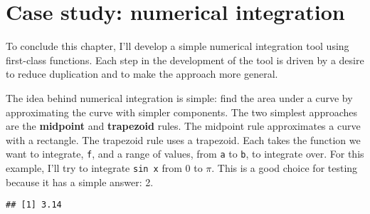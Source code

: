 \hypertarget{numerical-integration}{%
\section{Case study: numerical
integration}\label{numerical-integration}}

To conclude this chapter, I'll develop a simple numerical integration
tool using first-class functions. Each step in the development of the
tool is driven by a desire to reduce duplication and to make the
approach more general. 

The idea behind numerical integration is simple: find the area under a
curve by approximating the curve with simpler components. The two
simplest approaches are the \textbf{midpoint} and \textbf{trapezoid}
rules. The midpoint rule approximates a curve with a rectangle. The
trapezoid rule uses a trapezoid. Each takes the function we want to
integrate, \texttt{f}, and a range of values, from \texttt{a} to
\texttt{b}, to integrate over. For this example, I'll try to integrate
\texttt{sin\ x} from 0 to \(\pi\). This is a good choice for testing
because it has a simple answer: 2.

\begin{Shaded}
\begin{Highlighting}[]
\StringTok{ }
\OperatorTok{-}\StringTok{ }\OperatorTok{*}\StringTok{ }\OperatorTok{+}\StringTok{ }\OperatorTok{/}\StringTok{ }\NormalTok{)}
\NormalTok{\}}

\StringTok{ }
\OperatorTok{-}\StringTok{ }\OperatorTok{/}\StringTok{ } \OperatorTok{*}\StringTok{ }\NormalTok{(}\OperatorTok{+}\StringTok{ }
\NormalTok{\}}

\end{Highlighting}
\end{Shaded}

\begin{verbatim}
## [1] 3.14
\end{verbatim}

\begin{Shaded}
\begin{Highlighting}[]
\end{Highlighting}
\end{Shaded}

